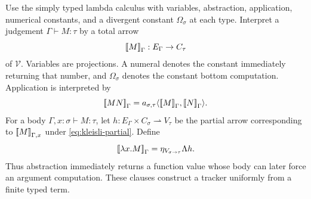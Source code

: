 \documentclass[11pt]{article}
\theoremstyle{definition}
\newcommand{\Vcat}{\mathcal V}
\newcommand{\den}[1]{\mathopen{[\mkern-3mu[}#1\mathclose{]\mkern-3mu]}}
\begin{document}
Use the simply typed lambda calculus with variables, abstraction,
application, numerical constants, and a divergent constant
$\Omega_\sigma$ at each type. Interpret a judgement
$\Gamma\vdash M:\tau$ by a total arrow
\[
 \den M_\Gamma:E_\Gamma\to C_\tau
\]
of $\Vcat$. Variables are projections. A numeral denotes the
constant immediately returning that number, and $\Omega_\sigma$
denotes the constant bottom computation. Application is interpreted by
\[
 \den{MN}_\Gamma
 =a_{\sigma,\tau}\langle\den M_\Gamma,\den N_\Gamma\rangle.
\]
For a body $\Gamma,x:\sigma\vdash M:\tau$, let
$h:E_\Gamma\times C_\sigma\rightharpoonup V_\tau$ be the
partial arrow corresponding to $\den M_{\Gamma,x}$ under
\eqref{eq:kleisli-partial}. Define
\begin{equation}\label{eq:lazy-lambda}
 \den{\lambda x.M}_\Gamma
       =\eta_{V_{\sigma\to\tau}}\Lambda h.
\end{equation}
Thus abstraction immediately returns a function value whose body can
later force an argument computation. These clauses construct a tracker
uniformly from a finite typed term.
\end{document}
